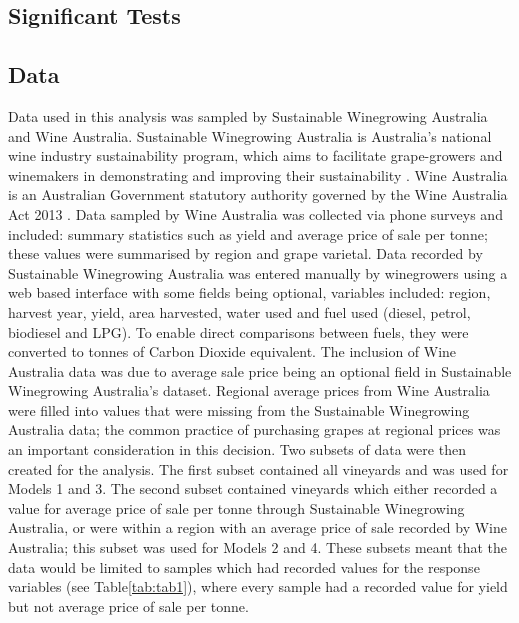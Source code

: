 \documentclass[review,12pt,authoryear]{elsarticle}
\begin{document}
\begin{linenumbers}
\subsection{Significant Tests}
%
%
%
%
\subsection{Data}
Data used in this analysis was sampled by Sustainable Winegrowing Australia and Wine Australia. Sustainable Winegrowing Australia is Australia's national wine industry sustainability program, which aims to facilitate grape-growers and winemakers in demonstrating and improving their sustainability \citep{swaSustainableWingrowingAustralia2022}. Wine Australia is an Australian Government statutory authority governed by the Wine Australia Act 2013 \citep{WineAustraliaAct2019}.
\newline
Data sampled by Wine Australia was collected via phone surveys and included: summary statistics such as yield and average price of sale per tonne; these values were summarised by region and grape varietal. Data recorded by Sustainable Winegrowing Australia was entered manually by winegrowers using a web based interface with some fields being optional, variables included: region, harvest year, yield, area harvested, water used and fuel used (diesel, petrol, biodiesel and LPG). To enable direct comparisons between fuels, they were converted to tonnes of Carbon Dioxide equivalent.
\newline
The inclusion of Wine Australia data was due to average sale price being an optional field in Sustainable Winegrowing Australia's dataset. 
Regional average prices from Wine Australia were filled into values that were missing from the Sustainable Winegrowing Australia data; the common practice of purchasing grapes at regional prices was an important consideration in this decision.
Two subsets of data were then created for the analysis. The first subset contained all vineyards and was used for Models 1 and 3. The second subset contained vineyards which either recorded a value for average price of sale per tonne through Sustainable Winegrowing Australia, or were within a region with an average price of sale recorded by Wine Australia; this subset was used for Models 2 and 4. These subsets meant that the data would be limited to samples which had recorded values for the response variables (see Table\ref{tab:tab1}), where every sample had a recorded value for yield but not average price of sale per tonne.

\end{linenumbers}
\end{document}
